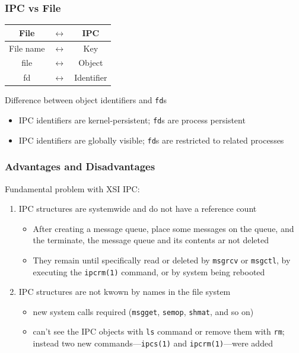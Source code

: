 \documentclass[newPxFont,sthlmFooter,nooffset]{beamer}
\begin{document}
\begin{frame}[t]
  \frametitle{IPC vs File}
  \begin{table}[h]
    \centering
    \begin{tabular}{c c c }
      File & $\longleftrightarrow$ & IPC \\ \hline
      File name & $\longleftrightarrow$ & Key \\
      file & $\longleftrightarrow$ & Object \\
      fd   & $\longleftrightarrow$ & Identifier
    \end{tabular}
  \end{table}

Difference between object identifiers and \texttt{fd}s
  \begin{itemize}
  \item IPC identifiers are kernel-persistent; \texttt{fd}s are process persistent
  \item IPC identifiers are globally visible; \texttt{fd}s are restricted to related processes
  \end{itemize}

\end{frame}


\begin{frame}[t]
  \frametitle{Advantages and Disadvantages}
Fundamental problem with XSI IPC:
  \begin{enumerate}
  \item IPC structures are systemwide and do not have a reference count
{\footnotesize
    \begin{itemize}
    \item After creating a message queue, place some messages on the queue, and the terminate, the message queue and its contents ar not deleted
    \item They remain until specifically read or deleted by \texttt{msgrcv} or \texttt{msgctl}, by executing the \texttt{ipcrm(1)} command, or by system being rebooted
    \end{itemize}
}
\item IPC structures are not kwown by names in the file system
{\footnotesize
  \begin{itemize}
  \item new system calls required (\texttt{msgget}, \texttt{semop}, \texttt{shmat}, and so on)
  \item can't see the IPC objects with \texttt{ls} command or remove them with \texttt{rm}; instead two new commands---\texttt{ipcs(1)} and \texttt{ipcrm(1)}---were added
  \end{itemize}
}
  \end{enumerate}

\end{frame}
\end{document}
